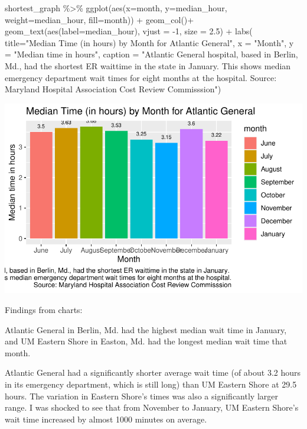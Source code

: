 \documentclass[
  letterpaper,
  DIV=11,
  numbers=noendperiod]{scrartcl}
\newenvironment{Shaded}{\begin{snugshade}}{\end{snugshade}}
\newcommand{\AttributeTok}[1]{\textcolor[rgb]{0.40,0.45,0.13}{#1}}
\newcommand{\DecValTok}[1]{\textcolor[rgb]{0.68,0.00,0.00}{#1}}
\newcommand{\FloatTok}[1]{\textcolor[rgb]{0.68,0.00,0.00}{#1}}
\newcommand{\FunctionTok}[1]{\textcolor[rgb]{0.28,0.35,0.67}{#1}}
\newcommand{\NormalTok}[1]{\textcolor[rgb]{0.00,0.23,0.31}{#1}}
\newcommand{\SpecialCharTok}[1]{\textcolor[rgb]{0.37,0.37,0.37}{#1}}
\newcommand{\StringTok}[1]{\textcolor[rgb]{0.13,0.47,0.30}{#1}}
\begin{document}
\begin{Shaded}
\begin{Highlighting}[]
\NormalTok{shortest\_graph }\SpecialCharTok{\%\textgreater{}\%} 
  \FunctionTok{ggplot}\NormalTok{(}\FunctionTok{aes}\NormalTok{(}\AttributeTok{x=}\NormalTok{month, }\AttributeTok{y=}\NormalTok{median\_hour, }\AttributeTok{weight=}\NormalTok{median\_hour, }\AttributeTok{fill=}\NormalTok{month)) }\SpecialCharTok{+}
  \FunctionTok{geom\_col}\NormalTok{()}\SpecialCharTok{+}
  \FunctionTok{geom\_text}\NormalTok{(}\FunctionTok{aes}\NormalTok{(}\AttributeTok{label=}\NormalTok{median\_hour), }\AttributeTok{vjust =} \SpecialCharTok{{-}}\DecValTok{1}\NormalTok{, }\AttributeTok{size =} \FloatTok{2.5}\NormalTok{) }\SpecialCharTok{+}
  \FunctionTok{labs}\NormalTok{(}
    \AttributeTok{title=}\StringTok{"Median Time (in hours) by Month for Atlantic General"}\NormalTok{,}
    \AttributeTok{x =} \StringTok{"Month"}\NormalTok{,}
    \AttributeTok{y =} \StringTok{"Median time in hours"}\NormalTok{,}
    \AttributeTok{caption =} \StringTok{"Atlantic General hospital, based in Berlin, Md., had the shortest ER waittime in the state in January. }
\StringTok{    This shows median emergency department wait times for eight months at the hospital.}
\StringTok{    Source: Maryland Hospital Association Cost Review Commisssion"}\NormalTok{)}
\end{Highlighting}
\end{Shaded}

\includegraphics{Condon_MD_HOSPITAL_DATA_FINAL_files/figure-pdf/unnamed-chunk-6-1.pdf}

Findings from charts:

Atlantic General in Berlin, Md. had the highest median wait time in
January, and UM Eastern Shore in Easton, Md. had the longest median wait
time that month.

Atlantic General had a significantly shorter average wait time (of about
3.2 hours in its emergency department, which is still long) than UM
Eastern Shore at 29.5 hours. The variation in Eastern Shore's times was
also a significantly larger range. I was shocked to see that from
November to January, UM Eastern Shore's wait time increased by almost
1000 minutes on average.
\end{document}
